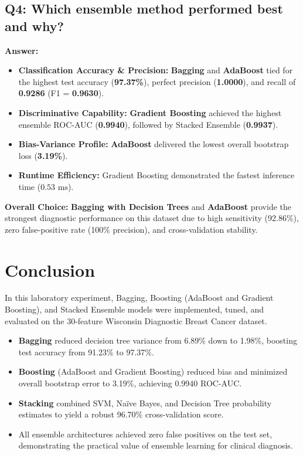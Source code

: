 \documentclass[12pt,a4paper]{article}
\begin{document}
\subsection*{Q4: Which ensemble method performed best and why?}
\textbf{Answer:}
\begin{itemize}
    \item \textbf{Classification Accuracy \& Precision:} \textbf{Bagging} and \textbf{AdaBoost} tied for the highest test accuracy (\textbf{97.37\%}), perfect precision (\textbf{1.0000}), and recall of \textbf{0.9286} (F1 = \textbf{0.9630}).
    \item \textbf{Discriminative Capability:} \textbf{Gradient Boosting} achieved the highest ensemble ROC-AUC (\textbf{0.9940}), followed by Stacked Ensemble (\textbf{0.9937}).
    \item \textbf{Bias-Variance Profile:} \textbf{AdaBoost} delivered the lowest overall bootstrap loss (\textbf{3.19\%}).
    \item \textbf{Runtime Efficiency:} Gradient Boosting demonstrated the fastest inference time ($0.53\text{ ms}$).
\end{itemize}
\textbf{Overall Choice:} \textbf{Bagging with Decision Trees} and \textbf{AdaBoost} provide the strongest diagnostic performance on this dataset due to high sensitivity (92.86\%), zero false-positive rate (100\% precision), and cross-validation stability.

\section{Conclusion}
In this laboratory experiment, Bagging, Boosting (AdaBoost and Gradient Boosting), and Stacked Ensemble models were implemented, tuned, and evaluated on the 30-feature Wisconsin Diagnostic Breast Cancer dataset.
\begin{itemize}
    \item \textbf{Bagging} reduced decision tree variance from 6.89\% down to 1.98\%, boosting test accuracy from 91.23\% to 97.37\%.
    \item \textbf{Boosting} (AdaBoost and Gradient Boosting) reduced bias and minimized overall bootstrap error to 3.19\%, achieving 0.9940 ROC-AUC.
    \item \textbf{Stacking} combined SVM, Na\"ive Bayes, and Decision Tree probability estimates to yield a robust 96.70\% cross-validation score.
    \item All ensemble architectures achieved zero false positives on the test set, demonstrating the practical value of ensemble learning for clinical diagnosis.
\end{itemize}
\end{document}
